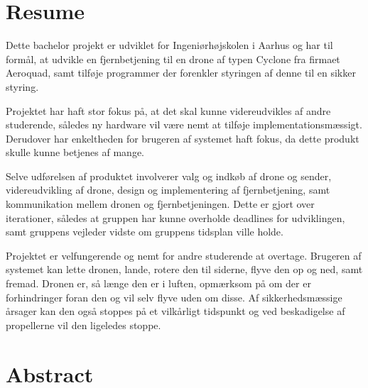\documentclass[Main]{subfiles}
\begin{document}
\chapter*{Resume}

Dette bachelor projekt er udviklet for Ingeniørhøjskolen i Aarhus og har til formål, at udvikle en fjernbetjening til en drone af typen Cyclone fra firmaet Aeroquad, samt tilføje programmer der forenkler styringen af denne til en sikker styring.

Projektet har haft stor fokus på, at det skal kunne videreudvikles af andre studerende, således ny hardware vil være nemt at tilføje implementationsmæssigt.
Derudover har enkeltheden for brugeren af systemet haft fokus, da dette produkt skulle kunne betjenes af mange.

Selve udførelsen af produktet involverer valg og indkøb af drone og sender, videreudvikling af drone, design og implementering af fjernbetjening, samt kommunikation mellem dronen og fjernbetjeningen.
Dette er gjort over iterationer, således at gruppen har kunne overholde deadlines for udviklingen, samt gruppens vejleder vidste om gruppens tidsplan ville holde.

Projektet er velfungerende og nemt for andre studerende at overtage.
Brugeren af systemet kan lette dronen, lande, rotere den til siderne, flyve den op og ned, samt fremad.
Dronen er, så længe den er i luften, opmærksom på om der er forhindringer foran den og vil  selv flyve uden om disse.
Af sikkerhedsmæssige årsager kan den også stoppes på et vilkårligt tidspunkt og ved beskadigelse af propellerne vil den ligeledes stoppe.




















\chapter*{Abstract}
\end{document}
